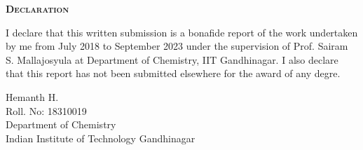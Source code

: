 \thispagestyle{empty}
\begin{center}
    \Large\scshape\textbf{Declaration}
\end{center}
\vspace{1em}

I declare that this written submission is a bonafide report of the work undertaken by me from July 2018 to September 2023 under the supervision of Prof. Sairam S. Mallajosyula at Department of Chemistry, IIT Gandhinagar. I also declare that this report has not been submitted elsewhere for the award of any degre.
\vspace{1.5em}
\begin{flushright}
    Hemanth H.\\
    Roll. No: 18310019 \\
    Department of Chemistry \\
    Indian Institute of Technology Gandhinagar
\end{flushright}
\afterpage{\blankpage}